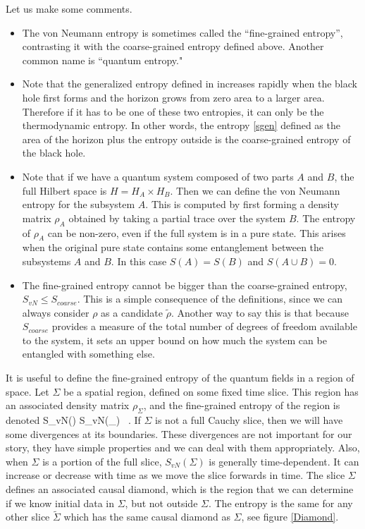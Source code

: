 Let us make some comments.
\begin{itemize}
	\item The von Neumann entropy is sometimes called the ``fine-grained entropy'', contrasting it with the  coarse-grained entropy defined above. Another common name is  ``quantum entropy." 
	\item 
 Note that the generalized entropy defined in  increases rapidly when the black hole first forms and the horizon grows from zero area to a larger area.   Therefore if it has to be one of these two entropies, it can only be the thermodynamic entropy. In other words, the entropy \eqref{sgen} defined as the area of the horizon plus the entropy outside is the coarse-grained entropy of the black hole. 
\item 
Note that if we have a quantum system composed of two parts $A$ and $B$, the full Hilbert space is $H= H_A \times H_B$. Then we can define the von Neumann entropy for the subsystem $A$.  This is computed  by first forming a density matrix $\rho_A$ obtained by taking a partial trace over the system $B$. The entropy of $\rho_A$ can be non-zero, even if the full system is in a pure state. This arises when the original pure state contains some entanglement between the subsystems $A$ and $B$. 
In this case $S(A)=S(B)$ and $S(A\cup B) =0$. 
\item
The fine-grained entropy cannot be bigger than the coarse-grained entropy, $S_{vN} \leq S_{coarse}$. 
 This is a simple consequence of the definitions, since we can always consider $\rho$ as a candidate $\tilde \rho$. Another way to say this is that because $S_{coarse}$ provides a measure of the total number of   degrees of freedom available to  the system, it sets an upper bound on how much the system can be entangled with something else.




  
 \end{itemize}


It is useful to define the fine-grained entropy of the quantum fields in a region of space. Let $\Sigma$ be a spatial region, defined on some fixed time slice. This region has an associated density matrix $\rho_{\Sigma}$, and the fine-grained entropy of the region is denoted
\be
 S_{vN}(\Sigma) \equiv S_{vN}(\rho_\Sigma) \ .
\ee
If $\Sigma$ is not a full Cauchy slice, then we will have some divergences at its boundaries. These divergences are not important for our story, they have simple properties and we can deal with them appropriately.  Also, when $\Sigma$ is a portion of the full slice,   $S_{vN}(\Sigma)$ is generally time-dependent. It can increase or decrease with time as we move the slice  forwards   in time. The slice $\Sigma$ defines an associated causal diamond, which is the region that we can determine if we know initial data in $\Sigma$, but not outside $\Sigma$. The entropy is the same for any other slice $\tilde \Sigma$ which has the same causal diamond as $\Sigma$, see figure \ref{Diamond}.  



